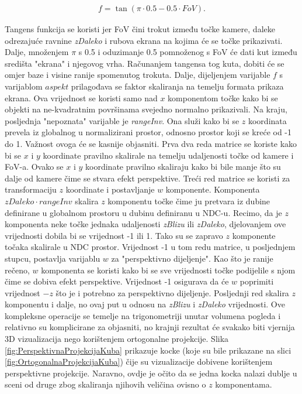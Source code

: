 \documentclass{foi}
\begin{document}
\begin{align*}
	f = \tan(\pi\cdot0.5 - 0.5\cdot FoV).
\end{align*}

Tangens funkcija se koristi jer FoV čini trokut između točke kamere, daleke odrezajuće ravnine \textit{zDaleko} i rubova ekrana na kojima će se točke prikazivati. Dalje, množenjem $\pi$ s 0.5 i oduzimanje 0.5 pomnoženog s FoV će dati kut između središta "ekrana" i njegovog vrha. Računanjem tangensa tog kuta, dobiti će se omjer baze i visine ranije spomenutog trokuta. Dalje, dijeljenjem varijable $f$ s varijablom $aspekt$ prilagođava se faktor skaliranja na temelju formata prikaza ekrana. Ova vrijednost se koristi samo nad $x$ komponentom točke kako bi se objekti na ne-kvadratnim površinama svejedno normalno prikazivali. Na kraju, posljednja "nepoznata" varijable je \textit{rangeInv}. Ona služi kako bi se $z$ koordinata prevela iz globalnog u normalizirani prostor, odnosno prostor koji se kreće od -1 do 1. Važnost ovoga će se kasnije objasniti. Prva dva reda matrice se koriste kako bi se $x$ i $y$ koordinate pravilno skalirale na temelju udaljenosti točke od kamere i FoV-a. Ovako se $x$ i $y$ koordinate pravilno skaliraju kako bi bile manje što su dalje od kamere čime se stvara efekt perspektive. Treći red matrice se koristi za transformaciju $z$ koordinate i postavljanje $w$ komponente. Komponenta $zDaleko \cdot rangeInv$ skalira $z$ komponentu točke čime ju pretvara iz dubine definirane u globalnom prostoru u dubinu definiranu u NDC-u. Recimo, da je $z$ komponenta neke točke jednaka udaljenosti \textit{zBlizu} ili \textit{zDaleko}, djelovanjem ove vrijednosti dobila bi se vrijednost -1 ili 1. Tako su se zapravo $z$ komponente točaka skalirale u NDC prostor. Vrijednost -1 u tom redu matrice, u posljednjem stupcu, postavlja varijablu $w$ za "perspektivno dijeljenje". Kao što je ranije rečeno, $w$ komponenta se koristi kako bi se sve vrijednosti točke podijelile s njom čime se dobiva efekt perspektive. Vrijednost -1 osigurava da će $w$ poprimiti vrijednost $-z$ što je i potrebno za perspektivno dijeljenje. Posljednji red skalira $z$ komponentu i dalje, no ovaj put u odnosu na \textit{zBlizu} i \textit{zDaleko} vrijednosti. Ove kompleksne operacije se temelje na trigonometriji unutar volumena pogleda i relativno su komplicirane za objasniti, no krajnji rezultat će svakako biti vjernija 3D vizualizacija nego korištenjem ortogonalne projekcije. Slika \ref{fig:PerspektivnaProjekcijaKuba} prikazuje kocke (koje su bile prikazane na slici \ref{fig:OrtogonalnaProjekcijaKuba}) čije su vizualizacije dobivene korištenjem perspektivne projekcije. Naravno, ovdje je očito da se jedna kocka nalazi dublje u sceni od druge zbog skaliranja njihovih veličina ovisno o $z$ komponentama.
\end{document}

